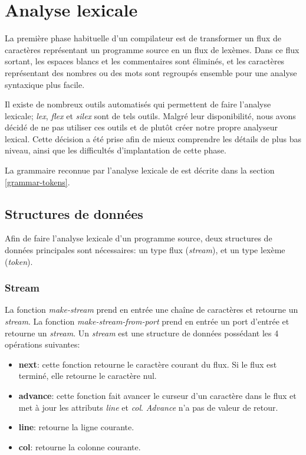 \documentclass[10pt]{report}
\begin{document}
\chapter{Analyse lexicale}

La première phase habituelle d'un compilateur est de transformer un
flux de caractères représentant un programme source en un flux de
lexèmes.  Dans ce flux sortant, les espaces blancs et les commentaires
sont éliminés, et les caractères représentant des nombres ou des mots
sont regroupés ensemble pour une analyse syntaxique plus facile.

Il existe de nombreux outils automatisés qui permettent de faire
l'analyse lexicale; \emph{lex}, \emph{flex} et \emph{silex} sont de
tels outils.  Malgré leur disponibilité, nous avons décidé de ne pas
utiliser ces outils et de plutôt créer notre propre analyseur lexical.
Cette décision a été prise afin de mieux comprendre les détails de
plus bas niveau, ainsi que les difficultés d'implantation de cette
phase.

La grammaire reconnue par l'analyse lexicale de \sins{} est décrite
dans la section \ref{grammar-tokens}.

\section{Structures de données}

Afin de faire l'analyse lexicale d'un programme source, deux
structures de données principales sont nécessaires: un type flux
(\emph{stream}), et un type lexème (\emph{token}).

\subsection{Stream}

La fonction \emph{make-stream} prend en entrée une chaîne de
caractères et retourne un \emph{stream}.  La fonction
\emph{make-stream-from-port} prend en entrée un port d'entrée et
retourne un \emph{stream}.  Un \emph{stream} est une structure de
données possédant les 4 opérations suivantes:

\begin{itemize}
\item {\bf next}: cette fonction retourne le caractère courant du
  flux.  Si le flux est terminé, elle retourne le caractère nul.
\item {\bf advance}: cette fonction fait avancer le curseur d'un
  caractère dans le flux et met à jour les attributs \emph{line} et
  \emph{col}.  \emph{Advance} n'a pas de valeur de retour.
\item {\bf line}: retourne la ligne courante.
\item {\bf col}: retourne la colonne courante.
\end{itemize}
\end{document}
